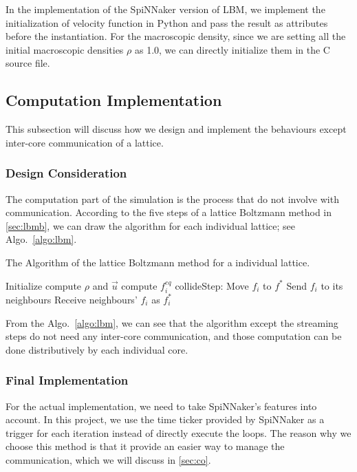 In the implementation of the SpiNNaker version of LBM, we implement the initialization of velocity function in Python and pass the result as attributes before the instantiation. For the macroscopic density, since we are setting all the initial macroscopic densities $\rho$ as 1.0, we can directly initialize them in the C source file.  \\

\subsection{Computation Implementation} \label{sec:cp}
This subsection will discuss how we design and implement the behaviours except inter-core communication of a lattice.\\
\subsubsection{Design Consideration}
The computation part of the simulation is the process that do not involve with communication. According to the five steps of a lattice Boltzmann method in \ref{sec:lbmb}, we can draw the algorithm for each individual lattice; see Algo.~\ref{algo:lbm}.\\

\begin{algorithm}
 \caption{The Algorithm of the lattice Boltzmann method for a individual lattice.}
 \label{algo:lbm}
 Initialize\;
  {
  compute $\rho$ and $\vec u$\;
 compute $f_i^{eq}$\;
 collideStep: Move $f_i$ to $f^*$ \;  
 Send $f_i$ to its neighbours\;  
 Receive neighbours' $f_i$ as $f_i^{*}$\; 
 }
 
\end{algorithm}

From the Algo.~\ref{algo:lbm}, we can see that the algorithm except the streaming steps do not need any inter-core communication, and those computation can be done distributively by each individual core.\\

\subsubsection{Final Implementation}
For the actual implementation, we need to take SpiNNaker's features into account. In this project, we use the time ticker provided by SpiNNaker as a trigger for each iteration instead of directly execute the loops. The reason why we choose this method is that it provide an easier way to manage the communication, which we will discuss in \ref{sec:co}.\\

